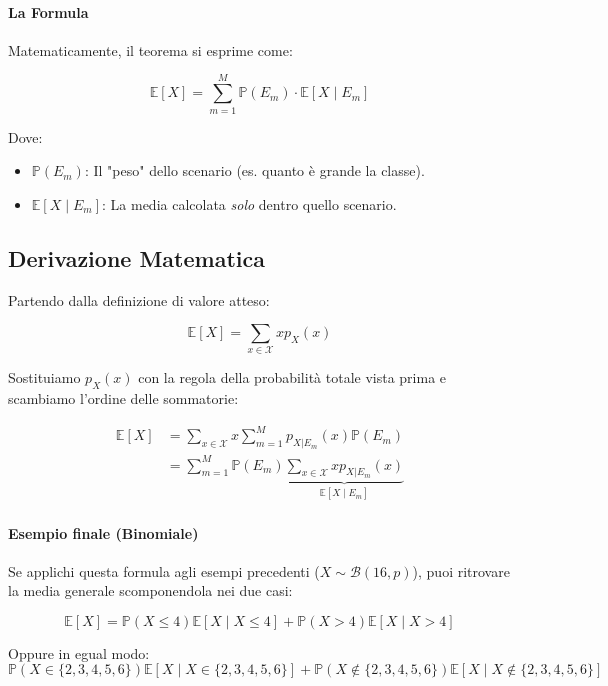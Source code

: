 \paragraph{La Formula}
Matematicamente, il teorema si esprime come:

\begin{equation}
\boxed{\mathbb{E}[X] = \sum_{m=1}^M \mathbb{P}(E_m) \cdot \mathbb{E}[X \mid E_m]}
\end{equation}

Dove:
\begin{itemize}
    \item $\mathbb{P}(E_m)$: Il "peso" dello scenario (es. quanto è grande la classe).
    \item $\mathbb{E}[X \mid E_m]$: La media calcolata \textit{solo} dentro quello scenario.
\end{itemize}

\subsection{Derivazione Matematica}

Partendo dalla definizione di valore atteso:

\[
\mathbb{E}[X] = \sum_{x \in \mathcal{X}} x p_X(x)
\]

Sostituiamo $p_X(x)$ con la regola della probabilità totale vista prima e scambiamo l'ordine delle sommatorie:

\begin{equation}
\begin{aligned}
\mathbb{E}[X] &= \sum_{x \in \mathcal{X}} x \sum_{m=1}^M p_{X|E_m}(x)\mathbb{P}(E_m) \\
&= \sum_{m=1}^M \mathbb{P}(E_m) \underbrace{\sum_{x \in \mathcal{X}} x p_{X|E_m}(x)}_{\mathbb{E}[X \mid E_m]}
\end{aligned}
\end{equation}

\paragraph{Esempio finale (Binomiale)}
Se applichi questa formula agli esempi precedenti ($X \sim \mathcal{B}(16, p)$), puoi ritrovare la media generale scomponendola nei due casi:

\[
\mathbb{E}[X] = \mathbb{P}(X \le 4)\mathbb{E}[X \mid X \le 4] + \mathbb{P}(X > 4)\mathbb{E}[X \mid X > 4]
\]

Oppure in egual modo:
\[
\mathbb{P}(X \in \{2,3,4,5,6\}) \mathbb{E}[X \mid X \in \{2,3,4,5,6\}] + \mathbb{P}(X \notin \{2,3,4,5,6\}) \mathbb{E}[X \mid X \notin \{2,3,4,5,6\}]
\]


